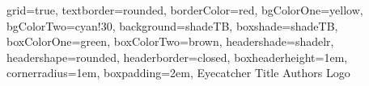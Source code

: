 \documentclass[a4paper,portrait,fontscale=1,margin=1cm,debug,table,showframe]{baposter}
\begin{document}
\begin{poster}{
  grid=true,
  textborder=rounded,
  borderColor=red,
  bgColorOne=yellow,
  bgColorTwo=cyan!30,
  background=shadeTB,
  boxshade=shadeTB,
  boxColorOne=green,
  boxColorTwo=brown,
  headershade=shadelr,
  headershape=rounded,
  headerborder=closed,
boxheaderheight=1em,
cornerradius=1em,
boxpadding=2em,
}
  {Eyecatcher}   %
  {\Huge Title}  %
  {Authors}  %
  {Logo}  %

% 
% 
% 
\end{poster}
\end{document}
